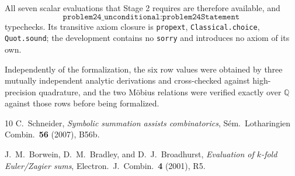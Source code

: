 \documentclass[11pt]{article}
\begin{document}
All seven scalar evaluations that Stage 2 requires are therefore available, and
\[
\texttt{problem24\_unconditional} : \texttt{problem24Statement}
\]
typechecks.  Its transitive axiom closure is \texttt{propext},
\texttt{Classical.choice}, \texttt{Quot.sound}; the development contains no
\texttt{sorry} and introduces no axiom of its own.

Independently of the formalization, the six row values were obtained by three
mutually independent analytic derivations and cross-checked against
high-precision quadrature, and the two M\"obius relations were verified exactly
over $\mathbb{Q}$ against those rows before being formalized.

\begin{thebibliography}{10}
C.~Schneider,
\emph{Symbolic summation assists combinatorics},
S\'em.\ Lotharingien Combin.\ \textbf{56} (2007), B56b.

J.~M.~Borwein, D.~M.~Bradley, and D.~J.~Broadhurst,
\emph{Evaluation of $k$-fold Euler/Zagier sums},
Electron.\ J.\ Combin.\ \textbf{4} (2001), R5.
\end{thebibliography}
\end{document}
